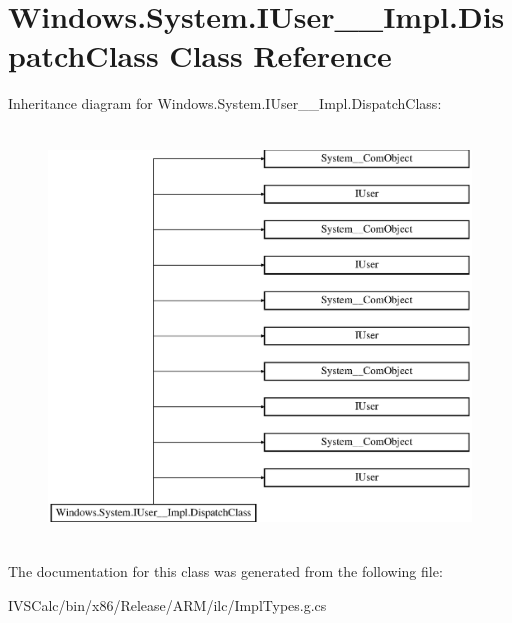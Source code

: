 \hypertarget{class_windows_1_1_system_1_1_i_user_____impl_1_1_dispatch_class}{}\section{Windows.\+System.\+I\+User\+\_\+\+\_\+\+Impl.\+Dispatch\+Class Class Reference}
\label{class_windows_1_1_system_1_1_i_user_____impl_1_1_dispatch_class}
Inheritance diagram for Windows.\+System.\+I\+User\+\_\+\+\_\+\+Impl.\+Dispatch\+Class\+:\begin{figure}[H]
\begin{center}
\leavevmode
\includegraphics[height=11.000000cm]{class_windows_1_1_system_1_1_i_user_____impl_1_1_dispatch_class}
\end{center}
\end{figure}


The documentation for this class was generated from the following file\+:\begin{DoxyCompactItemize}
\item 
I\+V\+S\+Calc/bin/x86/\+Release/\+A\+R\+M/ilc/Impl\+Types.\+g.\+cs\end{DoxyCompactItemize}
